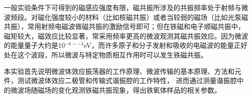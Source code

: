 \par 一般实验条件下可得到的磁感应强度有限，磁共振所涉及的共振频率处于射频与微波频段。对磁化强度较小的材料（比如核磁共振）或者当较弱的磁场（比如光泵磁共振），常用射频电磁波做磁共振的激励信号即可；但在铁磁和电子顺磁共振中，磁矩较大，磁效应比较显著，常采用频率更高的微波观测其磁共振效应。因为微波的能量量子大约是10$^{-6\sim -3}$eV，而许多原子和分子发射和吸收的电磁波的能量正好处在这个波段，所以微波与特定物质相互作用时可以发生铁磁共振。
\par 本实验首先说明微波体效应振荡器的工作原理、微波传输的基本原理、方法和元件，测试微波体效应二极管和传输式谐振腔的工作特性， 进而通过测量谐振腔中的微波场随磁场的变化观测铁磁共振现象，得出铁氧体样品的相关参数。